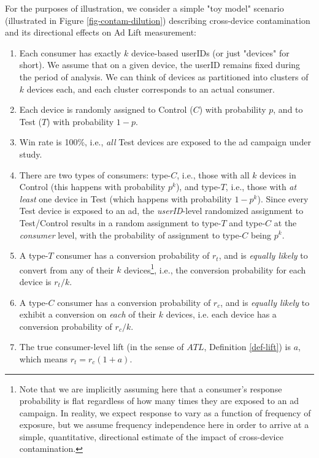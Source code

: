 \documentclass[11pt,a4paper]{article}
\theoremstyle{definition}
\theoremstyle{remark}
\theoremstyle{definition}
\theoremstyle{definition}
\theoremstyle{definition}
\theoremstyle{definition}
\theoremstyle{definition}
\theoremstyle{definition}
\begin{document}
For the purposes of illustration, we consider a simple "toy model" scenario (illustrated in Figure \ref{fig-contam-dilution}) describing cross-device contamination and its directional effects on Ad Lift measurement:
\begin{enumerate}
	\item Each consumer has exactly $k$ device-based userIDs (or just "devices" for short). We assume that on a given device, the userID remains fixed during the period of analysis. We can think of devices as partitioned into clusters of $k$ devices each, and each cluster corresponds to an actual consumer.
	\item Each device is randomly assigned to Control ($C$) with probability $p$, and to Test ($T$) with probability $1-p$.
	\item Win rate is 100\%, i.e., \textit{all} Test devices are exposed to the ad campaign under study.
	\item There are two types of consumers: type-$C$, i.e., those with all $k$ devices in Control (this happens with probability $p^k$), and type-$T$, i.e., those with {\em at least} one device in Test (which happens with probability $1-p^k$). Since every Test device is exposed to an ad, the \textit{userID}-level randomized assignment to Test/Control results in a random assignment to type-$T$ and type-$C$ at the \textit{consumer} level, with the probability of assignment to type-$C$ being $p^k$.
	\item A type-$T$ consumer has a conversion probability of $r_t$, and is \textit{equally likely} to convert from any of their $k$ devices\footnote{Note that we are implicitly assuming here that a consumer's response probability is flat regardless of how many times they are exposed to an ad campaign. In reality, we expect response to vary as a function of frequency of exposure, but we assume frequency independence here in order to arrive at a simple, quantitative, directional estimate of the impact of cross-device contamination.}, i.e., the conversion probability for each device is $r_t/k$. 
	\item A type-$C$ consumer has a conversion probability of $r_c$, and is \textit{equally likely} to exhibit a conversion on \textit{each} of their $k$ devices, i.e. each device has a conversion probability of $r_c/k$.
	\item The true consumer-level lift (in the sense of $ATL$, Definition \ref{def-lift}) is $a$, which means $r_t = r_c(1+a)$.
\end{enumerate}
\end{document}
